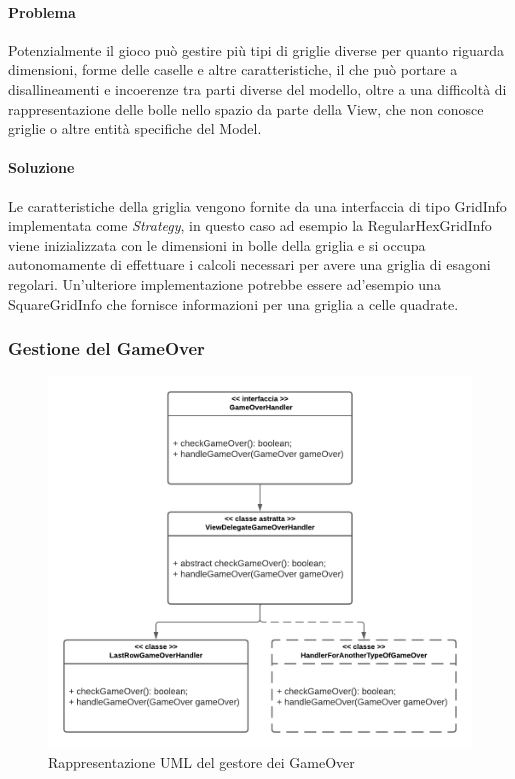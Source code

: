 \documentclass[a4paper,12pt]{report}
\begin{document}
\paragraph{Problema} Potenzialmente il gioco può gestire più tipi di griglie diverse per quanto riguarda dimensioni, forme delle caselle e altre caratteristiche, il che può portare a disallineamenti e incoerenze
tra parti diverse del modello, oltre a una difficoltà di rappresentazione delle bolle nello spazio da parte della View, che non conosce griglie o altre entità specifiche del Model.

\paragraph{Soluzione} Le caratteristiche della griglia vengono fornite da una interfaccia di tipo GridInfo implementata come \textit{Strategy}, in questo caso ad esempio la RegularHexGridInfo viene
inizializzata con le dimensioni in bolle della griglia e si occupa autonomamente di effettuare i calcoli necessari per avere una griglia di esagoni regolari. Un'ulteriore implementazione potrebbe essere
ad'esempio una SquareGridInfo che fornisce informazioni per una griglia a celle quadrate.

\subsubsection{Gestione del GameOver}

\begin{figure}[H]
	\centering{}
	\includegraphics[width=\textwidth]{img/gameover.pdf}
	\caption{Rappresentazione UML del gestore dei GameOver}
\end{figure}
\end{document}
